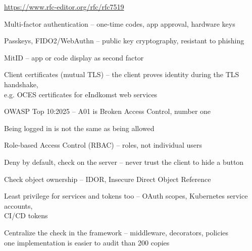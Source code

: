 \documentclass[Screen16to9,17pt]{foils}
\begin{document}
\url{https://www.rfc-editor.org/rfc/rfc7519}



\begin{list2}
\item Multi-factor authentication -- one-time codes, app approval, hardware keys
\item Passkeys, FIDO2/WebAuthn -- public key cryptography, resistant to phishing
\item MitID -- app or code display as second factor
\item Client certificates (mutual TLS) -- the client proves identity during the TLS handshake,\\
  e.g. OCES certificates for eIndkomst web services
\end{list2}






\begin{list2}
\item OWASP Top 10:2025 -- A01 is Broken Access Control, number one
\item Being logged in is not the same as being allowed
\item Role-based Access Control (RBAC) -- roles, not individual users
\item Deny by default, check on the server -- never trust the client to hide a button
\item Check object ownership -- IDOR, Insecure Direct Object Reference
\item Least privilege for services and tokens too -- OAuth scopes, Kubernetes service accounts,\\
  CI/CD tokens
\item Centralize the check in the framework -- middleware, decorators, policies\\
  one implementation is easier to audit than 200 copies
\end{list2}
\end{document}
